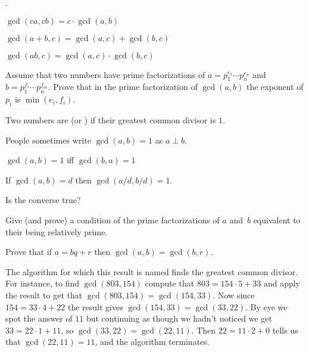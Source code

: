 \documentclass{ibl}
\begin{document}
\begin{ex}\pord.
\begin{exes}
\item $\gcd(ca,cb)=c\cdot\gcd(a,b)$
\item $\gcd(a+b,c)=\gcd(a,c)+\gcd(b,c)$
\item $\gcd(ab,c)=\gcd(a,c)\cdot\gcd(b,c)$    
\end{exes}
\end{ex}

\begin{ex}
Assume that two numbers have prime factorizations 
of $a=p_1^{e_1}\cdots p_n^{e_n}$
and $b=p_1^{f_1}\cdots p_n^{f_m}$.
Prove that in the prime factorization of
$\gcd(a,b)$ the exponent of $p_i$ is $\min(e_i,f_i)$.
\end{ex}

\begin{df}
Two numbers are  (or ) if their greatest common
divisor is $1$.
\end{df}

People sometimes write $\gcd(a,b)=1$ as $a\perp b$.

\begin{ex}
\begin{exes}
\item $\gcd(a,b)=1$ iff $\gcd(b,a)=1$
\item If $\gcd(a,b)=d$ then $\gcd(a/d, b/d)=1$.
\item Is the converse true?    
\end{exes}
\end{ex}

\begin{ex}
Give (and prove) a condition of the prime factorizations of $a$ and~$b$
equivalent to their being relatively prime.
\end{ex}

\begin{ex}
Prove that if $a=bq+r$ then $\gcd(a,b)=\gcd(b,r)$.  
\end{ex}

The algorithm for which this result is named finds the greatest common
divisor.  For instance, to find $\gcd(803,154)$ compute that
$803=154\cdot 5+33$ and apply the result to get that 
$\gcd(803,154)=\gcd(154,33)$.
Now since $154=33\cdot 4+22$ the result gives
$\gcd(154,33)=\gcd(33,22)$.
By eye we spot the answer of $11$ but continuing as though we hadn't noticed
we get $33=22\cdot 1+11$, so $\gcd(33,22)=\gcd(22,11)$.
Then $22=11\cdot 2+0$ tells us that $\gcd(22,11)=11$, and the algorithm 
terminates.
\end{document}
